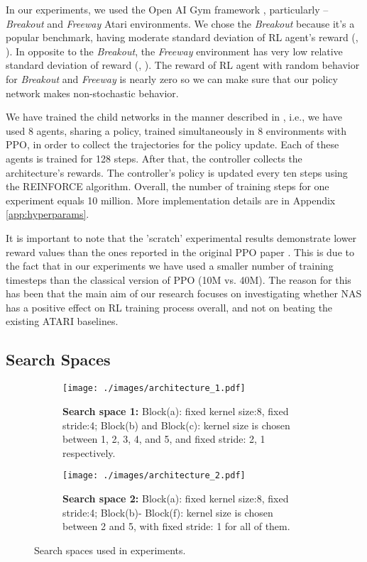 \documentclass{svproc}
\begin{document}
In our experiments, we used the Open AI Gym framework \cite{Brockman2016OpenAIG}, particularly --  \textit{Breakout} and \textit{Freeway} Atari environments.
We chose the \textit{Breakout} because it’s a popular benchmark, having moderate standard deviation of RL agent's reward (, \cite{Humanlevel2015}). In opposite to the \textit{Breakout}, the \textit{Freeway} environment has very low relative standard deviation of reward (, \cite{Humanlevel2015}).
The reward of RL agent with random behavior for \textit{Breakout} and \textit{Freeway} is nearly zero so we can make sure that our policy network makes non-stochastic behavior.

We have trained the child networks in the manner described in \cite{espeholt2018impala}, i.e., we have used 8 agents, sharing a policy, trained simultaneously in 8 environments with PPO, in order to collect the trajectories for the policy update. Each of these agents is trained for 128 steps. After that, the controller collects the architecture's rewards. The controller's policy is updated every ten steps using the REINFORCE algorithm. Overall, the number of training steps for one experiment equals 10 million. More implementation details are in Appendix \ref{app:hyperparams}.

It is important to note that the 'scratch' experimental results demonstrate lower reward values than the ones reported in the original PPO paper \cite{schulman2017proximal}. This is due to the fact that in our experiments we have used a smaller number of training timesteps than the classical version of PPO (10M vs. 40M). The reason for this has been that the main aim of our research focuses on investigating whether NAS has a positive effect on RL training process overall, and not on beating the existing ATARI baselines.
\subsection{Search Spaces}
\label{sec:search_sp}

\begin{figure}
\begin{subfigure}{\textwidth}
 \centering 
 \texttt{[image: ./images/architecture\_1.pdf]}
  \caption{\textbf{Search space 1:} Block(a): fixed kernel size:{8}, fixed stride:{4};  Block(b) and Block(c): kernel size is chosen between {1, 2, 3, 4, and 5}, and fixed stride: {2, 1} respectively.}
  \label{fig:architecture_1}
\end{subfigure}
\begin{subfigure}{\textwidth}
 \centering 
 \texttt{[image: ./images/architecture\_2.pdf]}
  \caption{\textbf{Search space 2:} Block(a): fixed kernel size:{8}, fixed stride:{4};  Block(b)- Block(f): kernel size is chosen between {2 and 5}, with fixed stride: {1} for all of them.}
  \label{fig:architecture_2}
\end{subfigure}
\caption{Search spaces used in experiments.}
\end{figure}
\end{document}

